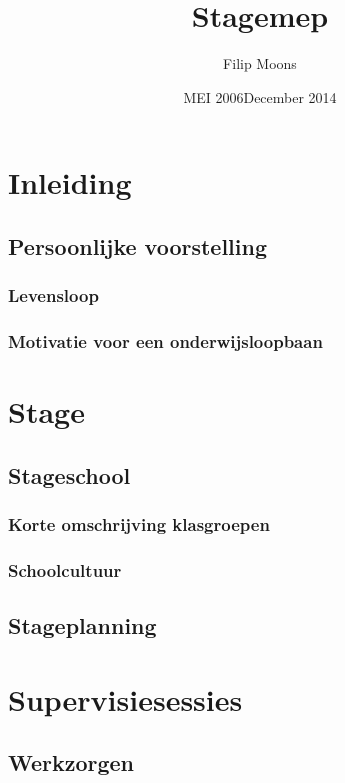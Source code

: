 \documentclass[a4paper,11pt]{article}
\author{Filip Moons}
\title{Stagemep}
\date{MEI 2006}
\date{December 2014}
\theoremstyle{definition}
\begin{document}
\maketitlepage


\tableofcontents
\newpage
\section{Inleiding}
\subsection{Persoonlijke voorstelling}
\subsubsection{Levensloop}
\subsubsection{Motivatie voor een onderwijsloopbaan}
\newpage
\section{Stage}
\subsection{Stageschool}
\subsubsection{Korte omschrijving klasgroepen}
\subsubsection{Schoolcultuur}
\subsection{Stageplanning}

\newpage
\section{Supervisiesessies}
\subsection{Werkzorgen}
\end{document}
